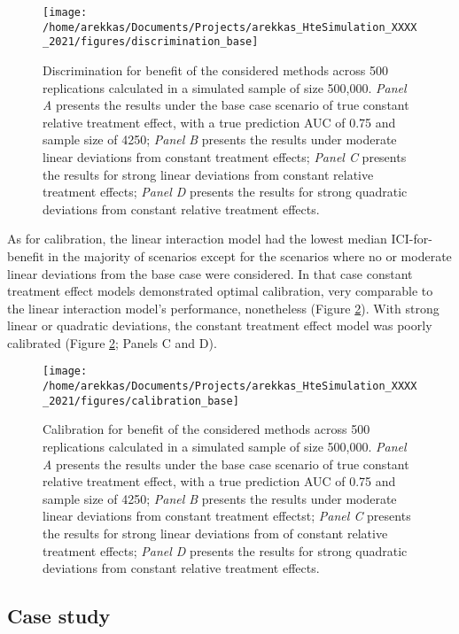 \documentclass{article}
\begin{document}
\begin{figure}
\texttt{[image: /home/arekkas/Documents/Projects/arekkas\_HteSimulation\_XXXX\_2021/figures/discrimination\_base]} \caption{Discrimination for benefit of the considered methods across 500 replications calculated in a simulated sample of size 500,000. \textit{Panel A} presents the results under the base case scenario of true constant relative treatment effect, with a true prediction AUC of 0.75 and sample size of 4250; \textit{Panel B} presents the results under moderate linear deviations from constant treatment effects; \textit{Panel C} presents the results for strong linear deviations from constant relative treatment effects; \textit{Panel D} presents the results for strong quadratic deviations from constant relative treatment effects.}\label{fig:discrimination}
\end{figure}

As for calibration, the linear interaction model had the lowest median
ICI-for-benefit in the majority of scenarios except for the scenarios
where no or moderate linear deviations from the base case were
considered. In that case constant treatment effect models demonstrated
optimal calibration, very comparable to the linear interaction model's
performance, nonetheless (Figure \ref{fig:calibration}). With strong
linear or quadratic deviations, the constant treatment effect model was
poorly calibrated (Figure \ref{fig:calibration}; Panels C and D).

\begin{figure}
\texttt{[image: /home/arekkas/Documents/Projects/arekkas\_HteSimulation\_XXXX\_2021/figures/calibration\_base]} \caption{Calibration for benefit of the considered methods across 500 replications calculated in a simulated sample of size 500,000. \textit{Panel A} presents the results under the base case scenario of true constant relative treatment effect, with a true prediction AUC of 0.75 and sample size of 4250; \textit{Panel B} presents the results under moderate linear deviations from constant treatment effectst; \textit{Panel C} presents the results for strong linear deviations from of constant relative treatment effects; \textit{Panel D} presents the results for strong quadratic deviations from constant relative treatment effects.}\label{fig:calibration}
\end{figure}

\hypertarget{case-study}{%
\subsection{Case study}\label{case-study}}
\end{document}
